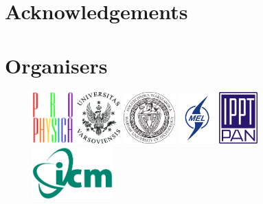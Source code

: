 \section*{Acknowledgements}
\lipsum[1-2]

\section*{Organisers}
\begin{figure}[H]%
\centering
	\includegraphics[height=2cm,keepaspectratio]{logo_organiz/prophys165x131px.pdf} \hfill
	\includegraphics[height=2cm,keepaspectratio]{logo_organiz/Logotyp_UW_lacina} \hfill
	\includegraphics[height=2cm,keepaspectratio]{logo_organiz/logo_Politechniki_Warszawskiej__NEW_POZYTYW_pol.pdf} \hfill
	\includegraphics[height=2cm,keepaspectratio]{logo_organiz/logo_meil.png} \hfill
	\includegraphics[height=2cm,keepaspectratio]{logo_organiz/oficjalne-logo-IPPT1200x1600} \hfill
	\includegraphics[height=2cm,keepaspectratio]{logo_organiz/logoICM} \hfill
\end{figure}

